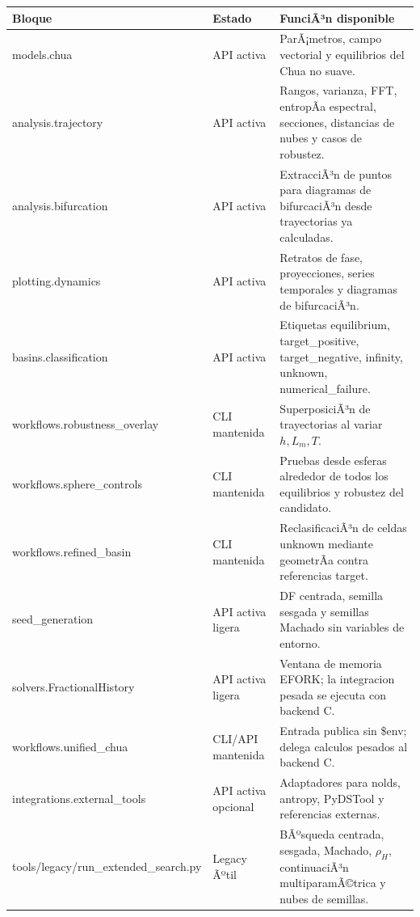 \documentclass[11pt]{article}
\DeclareRobustCommand{\codepath}[1]{\begingroup\Urlmuskip=0mu plus 2mu\path{#1}\endgroup}
\def\codepath#1{#1}%
\begin{document}
\begin{center}
\small
\begin{tabular}{@{}L{0.28\textwidth}L{0.24\textwidth}L{0.38\textwidth}@{}}
\toprule
Bloque & Estado & FunciÃ³n disponible\\
\midrule
\codepath{models.chua} & API activa & ParÃ¡metros, campo vectorial y equilibrios del Chua no suave.\\
\codepath{analysis.trajectory} & API activa & Rangos, varianza, FFT, entropÃ­a espectral, secciones, distancias de nubes y casos de robustez.\\
\codepath{analysis.bifurcation} & API activa & ExtracciÃ³n de puntos para diagramas de bifurcaciÃ³n desde trayectorias ya calculadas.\\
\codepath{plotting.dynamics} & API activa & Retratos de fase, proyecciones, series temporales y diagramas de bifurcaciÃ³n.\\
\codepath{basins.classification} & API activa & Etiquetas \codepath{equilibrium}, \codepath{target_positive}, \codepath{target_negative}, \codepath{infinity}, \codepath{unknown}, \codepath{numerical_failure}.\\
\codepath{workflows.robustness_overlay} & CLI mantenida & SuperposiciÃ³n de trayectorias al variar \(h,L_m,T\).\\
\codepath{workflows.sphere_controls} & CLI mantenida & Pruebas desde esferas alrededor de todos los equilibrios y robustez del candidato.\\
\codepath{workflows.refined_basin} & CLI mantenida & ReclasificaciÃ³n de celdas \codepath{unknown} mediante geometrÃ­a contra referencias target.\\
\codepath{seed_generation} & API activa ligera & DF centrada, semilla sesgada y semillas Machado sin variables de entorno.\\
\codepath{solvers.FractionalHistory} & API activa ligera & Ventana de memoria EFORK; la integracion pesada se ejecuta con backend C.\\
\codepath{workflows.unified_chua} & CLI/API mantenida & Entrada publica sin \codepath{\$env}; delega calculos pesados al backend C.\\
\codepath{integrations.external_tools} & API activa opcional & Adaptadores para \codepath{nolds}, \codepath{antropy}, PyDSTool y referencias externas.\\
\codepath{tools/legacy/run_extended_search.py} & Legacy Ãºtil & BÃºsqueda centrada, sesgada, Machado, \(\rho_H\), continuaciÃ³n multiparamÃ©trica y nubes de semillas.\\

\end{tabular}
\end{center}
\end{document}
